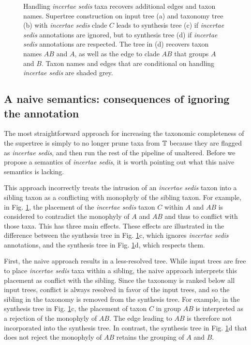 \documentclass[english]{article}
\begin{document}
\begin{figure}
\caption{\label{fig:Handling-incertae-sedis}Handling \emph{incertae sedis
}taxa recovers additional edges and taxon names.
Supertree construction on input tree (a) and taxonomy tree (b) with \emph{incertae sedis}
clade $C$ leads to synthesis tree (c) if \emph{incertae sedis} annotations are
ignored, but to synthesis tree (d) if \emph{incertae sedis} annotations are respected.
The tree in (d) recovers taxon names $AB$ and $A$, as well as the edge to clade $AB$
that groups $A$ and $B$. Taxon names and edges that are conditional on handling
\emph{incertae sedis} are shaded grey. 
}

\end{figure}

\subsection{A naive semantics: consequences of ignoring the annotation}

The most straightforward approach for increasing the taxonomic completeness of
the supertree is simply to no longer prune taxa from $\mbox{\ensuremath{\mathbb{T}}}$ because they are flagged
as \emph{incertae sedis}, and then run the rest of the pipeline of
\citet{redelings2017supertree} unaltered.  Before we propose a semantics of
\emph{incertae sedis}, it is worth pointing out what this naive semantics is lacking.

This approach incorrectly treats the intrusion of an \emph{incertae sedis} taxon
into a sibling taxon as a conflicting with monophyly of the sibling taxon. For
example, in Fig. \ref{fig:Handling-incertae-sedis}, the placement of the
\emph{incertae sedis} taxon $C$ within $A$ and $AB$ is considered
to contradict the monophyly of $A$ and $AB$ and thus to conflict with those taxa.
This has three main effects.  These effects are illustrated in the difference
between the synthesis tree in Fig. \ref{fig:Handling-incertae-sedis}c, which
ignores \emph{incertae sedis} annotations, and the synthesis tree in Fig.
\ref{fig:Handling-incertae-sedis}d, which respects them.

First, the naive approach results in a less-resolved tree.  While input trees are
free to place \emph{incertae sedis} taxa within a sibling, the naive approach
interprets this placement as conflict with the sibling.  Since the taxonomy
is ranked below all input trees, conflict is always resolved in favor of the
input trees, and so the sibling in the taxonomy is removed from the synthesis
tree.  For example, in the synthesis tree in Fig.
\ref{fig:Handling-incertae-sedis}c, the placement of taxon $C$ in group $AB$ is
interpreted as a rejection of the monophyly of $AB$. The edge leading to $AB$ is
therefore not incorporated into the synthesis tree.  In contrast, the synthesis
tree in Fig. \ref{fig:Handling-incertae-sedis}d that does not reject the
monophyly of $AB$ retains the grouping of $A$ and $B$.
\end{document}
